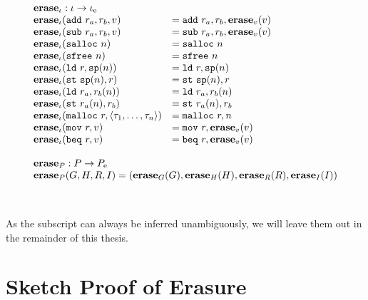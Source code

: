 {\[\begin{array}{l}
\begin{array}{ll}
\rlap{$\erase_{\iota} : \high\iota -> \simple{\iota}$} \\
\erase_{\iota}(\mathtt{add}\ r_a, r_b, \high v) &= \mathtt{add}\ r_a, r_b, \erase_v(\high v) \\
\erase_{\iota}(\mathtt{sub}\ r_a, r_b, \high v) &= \mathtt{sub}\ r_a, r_b, \erase_v(\high v) \\
\erase_{\iota}(\mathtt{salloc}\ n) &= \mathtt{salloc}\ n \\
\erase_{\iota}(\mathtt{sfree}\ n) &= \mathtt{sfree}\ n \\
\erase_{\iota}(\mathtt{ld}\ r, \mathtt{sp}(n)) &= \mathtt{ld}\ r, \mathtt{sp}(n) \\
\erase_{\iota}(\mathtt{st}\ \mathtt{sp}(n), r) &= \mathtt{st}\ \mathtt{sp}(n), r \\
\erase_{\iota}(\mathtt{ld}\ r_a, r_b(n)) &= \mathtt{ld}\ r_a, r_b(n) \\
\erase_{\iota}(\mathtt{st}\ r_a(n), r_b) &= \mathtt{st}\ r_a(n), r_b \\
\erase_{\iota}(\mathtt{malloc}\ r, \langle \tau_1, \dots, \tau_n \rangle) &= \mathtt{malloc}\ r, n \\
\erase_{\iota}(\mathtt{mov}\ r, \high v) &= \mathtt{mov}\ r, \erase_v(\high v) \\
\erase_{\iota}(\mathtt{beq}\ r, \high v) &= \mathtt{beq}\ r, \erase_v(\high v) \\
\end{array} \\\\

\begin{array}{l}
\erase_P : \high P -> \simple{P} \\
\erase_P(\high G, \high H, \high R, \high I) = (\erase_G(\high G), \erase_H(\high H), \erase_R(\high R), \erase_I(\high I)) \\\\
\end{array} \\\\

\end{array}\]
}

As the subscript can always be inferred unambiguously, we will leave them
out in the remainder of this thesis.

\section{Sketch Proof of Erasure}

